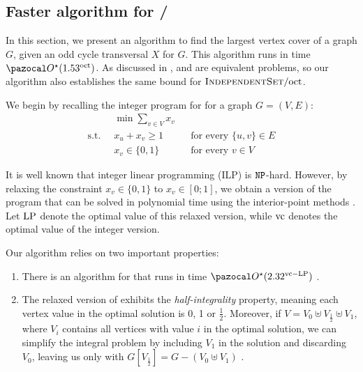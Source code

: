 \subsection{Faster algorithm for /\oct}
\label{section:indset-oct}

In this section, we present an algorithm to find the largest vertex cover of a graph $G$, given an odd cycle transversal $X$ for $G$. This algorithm runs in time $\O^\star(1.53^\oct)$. As discussed in ,  and  are equivalent problems, so our algorithm also establishes the same bound for $\textsc{IndependentSet}/\text{oct}$.

\medskip

We begin by recalling the integer program for  for a graph $G = (V, E)$:
\begin{align*}
    &\min \sum_{v \in V} x_v\\
    \text{s.t.}\;\; & x_u + x_v \geq 1 &&\text{for every } \{u,v\} \in E\\
    & x_v \in \{0,1\} &&\text{for every } v \in V
\end{align*}
    
It is well known that integer linear programming (ILP) is $\texttt{NP}$-hard. However, by relaxing the constraint $x_v \in \{0, 1\}$ to $x_v \in [0; 1]$, we obtain a version of the program that can be solved in polynomial time using the \mbox{interior-point} methods \cite{karmarkar1984new}. Let $\text{LP}$ denote the optimal value of this relaxed version, while $\text{vc}$ denotes the optimal value of the integer version.

\medskip

Our algorithm relies on two important properties:
\begin{enumerate}
    \item There is an algorithm for  that runs in time $\O^\star(2.32^{\vc - \LP})$ \cite{lokshtanov2014faster}.
    \item The relaxed version of  exhibits the \textit{half-integrality} property, meaning each vertex value in the optimal solution is 0, 1 or $\frac{1}{2}$. Moreover, if $V = V_0 \uplus V_{\frac{1}{2}} \uplus V_1$, where $V_i$ contains all vertices with value $i$ in the optimal solution, we can simplify the integral  problem by including $V_1$ in the solution and discarding $V_0$, leaving us only with $G[V_{\frac{1}{2}}] = G - (V_0 \uplus V_1)$ \cite{nemhauser1975vertex}.
\end{enumerate}

